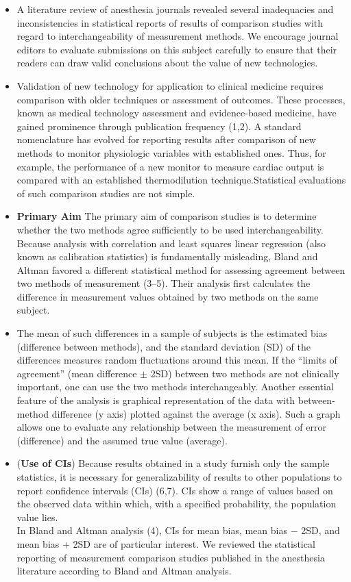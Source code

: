 \documentclass[]{article}
\begin{document}
	\begin{itemize}
		\item A literature review of anesthesia journals revealed several inadequacies and inconsistencies in statistical reports of results of comparison studies with regard to interchangeability of measurement methods. We encourage journal editors to evaluate submissions on this subject carefully to ensure that their readers can draw valid conclusions about the value of new technologies.
		
		\item Validation of new technology for application to clinical medicine requires comparison with older techniques or assessment of outcomes. These processes, known as medical technology assessment and evidence-based medicine, have gained prominence through publication frequency (1,2). A standard nomenclature has evolved for reporting results after comparison of new methods to monitor physiologic variables with established ones. Thus, for example, the performance of a new monitor to measure cardiac output is compared with an established thermodilution technique.Statistical evaluations of such comparison studies are not simple. 
		
		\item \textbf{Primary Aim} The primary aim of comparison studies is to determine whether the two methods agree sufficiently to be used interchangeability. Because analysis with correlation and least squares linear regression (also known as calibration statistics) is fundamentally misleading, Bland and Altman favored a different statistical method for assessing agreement between two methods of measurement (3–5). Their analysis first calculates the difference in measurement values obtained by two methods on the same subject. 
		
		\item The mean of such differences in a sample of subjects is the estimated bias (difference between methods), and the standard deviation (SD) of the differences measures random fluctuations around this mean. If the “limits of agreement” (mean difference $\pm$ 2SD) between two methods are not clinically important, one can use the two methods interchangeably. Another essential feature of the analysis is graphical representation of the data with between-method difference (y axis) plotted against the average (x axis). Such a graph allows one to evaluate any relationship between the measurement of error (difference) and the assumed true value (average). 
		
		\item (\textbf{Use of CIs}) Because results obtained in a study furnish only the sample statistics, it is necessary for generalizability of results to other populations to report confidence intervals (CIs) (6,7). CIs show a range of values based on the observed data within which, with a specified probability, the population value lies. \\ In Bland and Altman analysis (4), CIs for mean bias, mean bias − 2SD, and mean bias + 2SD are of particular interest. We reviewed the statistical reporting of measurement comparison studies published in the anesthesia literature according to Bland and Altman analysis.
	\end{itemize}
\end{document}
